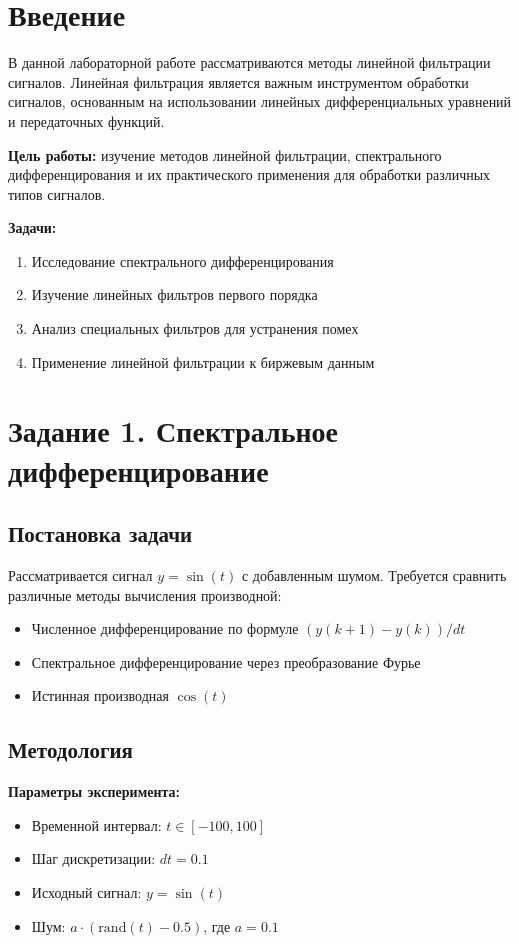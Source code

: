\section*{Введение}

В данной лабораторной работе рассматриваются методы линейной фильтрации сигналов. Линейная фильтрация является важным инструментом обработки сигналов, основанным на использовании линейных дифференциальных уравнений и передаточных функций.

\textbf{Цель работы:} изучение методов линейной фильтрации, спектрального дифференцирования и их практического применения для обработки различных типов сигналов.

\textbf{Задачи:}
\begin{enumerate}
    \item Исследование спектрального дифференцирования
    \item Изучение линейных фильтров первого порядка
    \item Анализ специальных фильтров для устранения помех
    \item Применение линейной фильтрации к биржевым данным
\end{enumerate}

\section*{Задание 1. Спектральное дифференцирование}

\subsection*{Постановка задачи}

Рассматривается сигнал $y = \sin(t)$ с добавленным шумом. Требуется сравнить различные методы вычисления производной:
\begin{itemize}
    \item Численное дифференцирование по формуле $(y(k+1) - y(k))/dt$
    \item Спектральное дифференцирование через преобразование Фурье
    \item Истинная производная $\cos(t)$
\end{itemize}

\subsection*{Методология}

\textbf{Параметры эксперимента:}
\begin{itemize}
    \item Временной интервал: $t \in [-100, 100]$
    \item Шаг дискретизации: $dt = 0.1$
    \item Исходный сигнал: $y = \sin(t)$
    \item Шум: $a \cdot (\text{rand}(t) - 0.5)$, где $a = 0.1$
\end{itemize}


